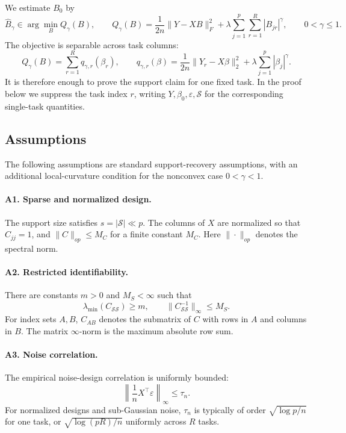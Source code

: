 \documentclass{article}
\begin{document}
We estimate \(B_0\) by
\begin{equation}
\widehat B_\gamma\in
\arg\min_B
Q_\gamma(B),
\qquad
Q_\gamma(B)=
\frac{1}{2n}\|Y-XB\|_F^2+
\lambda\sum_{j=1}^{p}\sum_{r=1}^{R}|B_{jr}|^\gamma,
\qquad 0<\gamma\le1 .
\label{eq:lgamma_multitask_objective}
\end{equation}
The objective is separable across task columns:
\begin{equation}
Q_\gamma(B)=\sum_{r=1}^{R}q_{\gamma,r}(\beta_r),
\qquad
q_{\gamma,r}(\beta)=
\frac{1}{2n}\|Y_r-X\beta\|_2^2+
\lambda\sum_{j=1}^{p}|\beta_j|^\gamma .
\end{equation}
It is therefore enough to prove the support claim for one fixed task. In the proof below we suppress the task index \(r\), writing \(Y,\beta_0,\varepsilon,\mathcal S\) for the corresponding single-task quantities.

\subsection{Assumptions}

The following assumptions are standard support-recovery assumptions, with an additional local-curvature condition for the nonconvex case \(0<\gamma<1\).

\paragraph{A1. Sparse and normalized design.}
The support size satisfies \(s=|\mathcal S|\ll p\). The columns of \(X\) are normalized so that \(C_{jj}=1\), and \(\|C\|_{op}\le M_C\) for a finite constant \(M_C\). Here \(\|\cdot\|_{op}\) denotes the spectral norm.

\paragraph{A2. Restricted identifiability.}
There are constants \(m>0\) and \(M_S<\infty\) such that
\begin{equation}
\lambda_{\min}(C_{\mathcal S\mathcal S})\ge m,
\qquad
\|C_{\mathcal S\mathcal S}^{-1}\|_\infty\le M_S .
\label{eq:restricted_identifiability_lgamma}
\end{equation}
For index sets \(A,B\), \(C_{AB}\) denotes the submatrix of \(C\) with rows in \(A\) and columns in \(B\). The matrix \(\infty\)-norm is the maximum absolute row sum.

\paragraph{A3. Noise correlation.}
The empirical noise-design correlation is uniformly bounded:
\begin{equation}
\left\|\frac{1}{n}X^\top\varepsilon\right\|_\infty\le\tau_n .
\label{eq:noise_correlation_lgamma}
\end{equation}
For normalized designs and sub-Gaussian noise, \(\tau_n\) is typically of order \(\sqrt{\log p/n}\) for one task, or \(\sqrt{\log(pR)/n}\) uniformly across \(R\) tasks.
\end{document}
